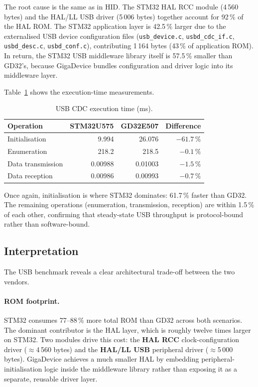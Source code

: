 The root cause is the same as in HID. The STM32 HAL RCC module (4\,560 bytes) and the
HAL/LL USB driver (5\,006 bytes) together account for 92\,\% of the HAL ROM.
The STM32 application layer is 42.5\,\% larger due to the externalised USB device
configuration files (\texttt{usb\_device.c}, \texttt{usbd\_cdc\_if.c},
\texttt{usbd\_desc.c}, \texttt{usbd\_conf.c}), contributing 1\,164 bytes (43\,\% of
application ROM). In return, the STM32 USB middleware library itself is 57.5\,\% smaller
than GD32's, because GigaDevice bundles configuration and driver logic into its middleware
layer.

Table~\ref{tab:gd32-usb-cdc-exec} shows the execution-time measurements.

\begin{table}[H]
  \centering
  \caption{USB CDC execution time (ms).}
  \label{tab:gd32-usb-cdc-exec}
  \begin{tabular}{l r r r}
    \toprule
    \textbf{Operation} & \textbf{STM32U575} & \textbf{GD32E507} & \textbf{Difference} \\
    \midrule
    Initialisation      & 9.994   & 26.076 & $-61.7\,\%$ \\
    Enumeration         & 218.2   & 218.5  & $-0.1\,\%$ \\
    Data transmission   & 0.00988 & 0.01003 & $-1.5\,\%$ \\
    Data reception      & 0.00986 & 0.00993 & $-0.7\,\%$ \\
    \bottomrule
  \end{tabular}
\end{table}

Once again, initialisation is where STM32 dominates: 61.7\,\% faster than GD32. The
remaining operations (enumeration, transmission, reception) are within 1.5\,\% of each
other, confirming that steady-state USB throughput is protocol-bound rather than
software-bound.

\subsection{Interpretation}
\label{sec:gd32-usb-interp}

The USB benchmark reveals a clear architectural trade-off between the two vendors.

\paragraph{ROM footprint.}
STM32 consumes 77--88\,\% more total ROM than GD32 across both scenarios. The dominant
contributor is the HAL layer, which is roughly twelve times larger on STM32. Two modules
drive this cost: the \textbf{HAL RCC} clock-configuration driver ($\approx$4\,560 bytes)
and the \textbf{HAL/LL USB} peripheral driver ($\approx$5\,000 bytes). GigaDevice achieves
a much smaller HAL by embedding peripheral-initialisation logic inside the middleware
library rather than exposing it as a separate, reusable driver layer.

